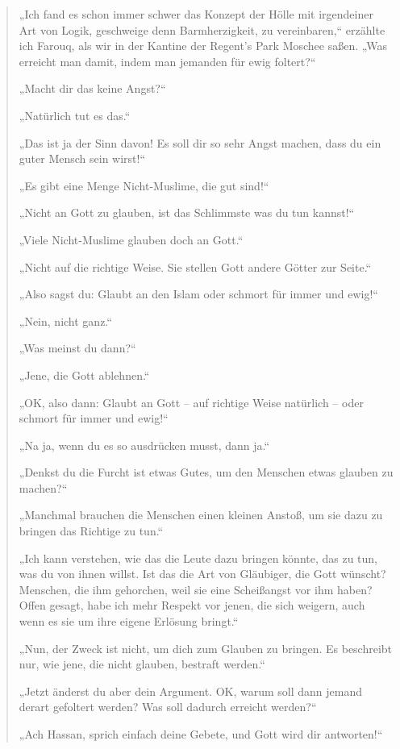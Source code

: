 \documentclass[12pt]{memoir}
\begin{document}
\begin{quote}
„Ich fand es schon immer schwer das Konzept der Hölle
mit irgendeiner Art von Logik, geschweige denn Barmherzigkeit,
zu vereinbaren,“
erzählte ich Farouq, als wir in der Kantine der Regent’s Park Moschee saßen.
„Was erreicht man damit, indem man jemanden für ewig foltert?“

„Macht dir das keine Angst?“

„Natürlich tut es das.“

„Das ist ja der Sinn davon!
Es soll dir so sehr Angst machen, dass du ein guter Mensch sein wirst!“

„Es gibt eine Menge Nicht-Muslime, die gut sind!“

„Nicht an Gott zu glauben, ist das Schlimmste was du tun kannst!“

„Viele Nicht-Muslime glauben doch an Gott.“

„Nicht auf die richtige Weise.
Sie stellen Gott andere Götter zur Seite.“

„Also sagst du: Glaubt an den Islam
oder schmort für immer und ewig!“

„Nein, nicht ganz.“

„Was meinst du dann?“

„Jene, die Gott ablehnen.“

„OK, also dann: Glaubt an Gott – auf richtige Weise natürlich –
oder schmort für immer und ewig!“

„Na ja, wenn du es so ausdrücken musst, dann ja.“

„Denkst du die Furcht ist etwas Gutes,
um den Menschen etwas glauben zu machen?“

„Manchmal brauchen die Menschen einen kleinen Anstoß,
um sie dazu zu bringen das Richtige zu tun.“

„Ich kann verstehen, wie das die Leute dazu bringen könnte,
das zu tun, was du von ihnen willst.
Ist das die Art von Gläubiger, die Gott wünscht?
Menschen, die ihm gehorchen, weil sie eine Scheißangst vor ihm haben?
Offen gesagt, habe ich mehr Respekt vor jenen, die sich weigern,
auch wenn es sie um ihre eigene Erlösung bringt.“

„Nun, der Zweck ist nicht, um dich zum Glauben zu bringen.
Es beschreibt nur, wie jene, die nicht glauben, bestraft werden.“

„Jetzt änderst du aber dein Argument.
OK, warum soll dann jemand derart gefoltert werden?
Was soll dadurch erreicht werden?“

„Ach Hassan, sprich einfach deine Gebete, und Gott wird dir antworten!“
\end{quote}
\end{document}
